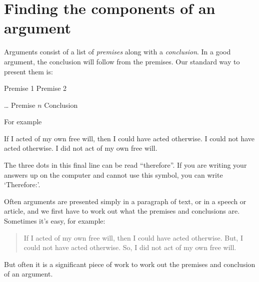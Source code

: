 




\section{Finding the components of an argument}



Arguments consist of a list of \emph{premises} along with a \emph{conclusion}. In a good argument, the conclusion will follow from the premises.
Our standard way to present them is:
\begin{earg}
\prem Premise 1
\prem Premise 2
\item[] \dots
\prem Premise $n$
\conc Conclusion
\end{earg}

For	example
	\begin{earg}
	\prem If I acted of my own free will, then I could have acted otherwise.
	\prem I could not have acted otherwise.
	\conc I did not act of my own free will.
	\end{earg}

The three dots in this final line can be read ``therefore''. 
If you are writing your answers up on the computer and cannot use this symbol, you can write `Therefore:'.


Often arguments are presented simply in a paragraph of text, or in a speech or article, and we first have to work out what the premises and conclusions are.
Sometimes it's easy, for example:
\begin{quote}
	If I acted of my own free will, then I could have acted otherwise.
	But, I could not have acted otherwise.
	So, I did not act of my own free will.
\end{quote}
But often it is a significant piece of work to work out the premises and conclusion of an argument.




